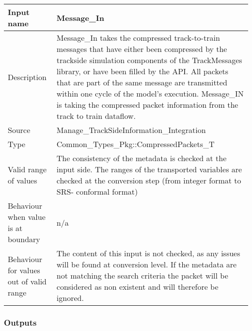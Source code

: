 \begin{longtable}{p{}p{}}
\toprule
Input name				& Message\_In \\
\midrule
Description				& Message\_In takes the compressed track-to-train messages that have either been compressed by the trackside simulation components of the TrackMessages library, or have been filled by the API. All packets that are part of the same message are transmitted within one cycle of the model's execution. Message\_IN is taking the compressed packet information from the track to train dataflow. \\
\midrule
Source					& Manage\_TrackSideInformation\_Integration \\ 
\midrule
Type					& Common\_Types\_Pkg::CompressedPackets\_T \\
\midrule
Valid range of values 	& The consistency of the metadata is checked at the input side. The ranges of the transported variables are checked at the conversion step (from integer format to SRS- conformal format)
 \\
\midrule
Behaviour when value is at boundary	& n/a \\
\midrule
Behaviour for values out of valid range	& The content of this input is not checked, as any issues will be found at conversion level. If the metadata are not matching the search criteria the packet will be considered as non existent and will therefore be ignored. 
 \\
\bottomrule
\end{longtable}




\subsubsection{Outputs}\label{s:trackside_outputs}

